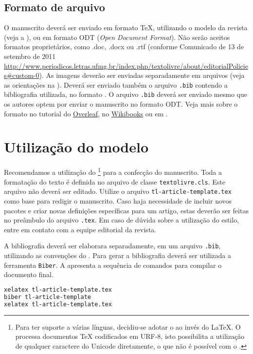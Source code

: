 \documentclass{textolivre}
\begin{document}
\subsection{Formato de arquivo}\label{sec-formato}
O manuscrito deverá ser enviado em formato \TeX{}, utilizando o modelo da revista (veja a ),
ou em formato ODT (\emph{Open Document Format}). Não serão aceitos formatos proprietários, como .doc, .docx ou .rtf
(conforme Comunicado de 13 de setembro de 2011 \url{http://www.periodicos.letras.ufmg.br/index.php/textolivre/about/editorialPolicies#custom-0}). 
As imagens deverão ser enviadas separadamente em arquivos (veja as orientações na ).
Deverá ser enviado também o arquivo \texttt{.bib} contendo a bibliografia utilizada, no formato .
O arquivo \texttt{.bib} deverá ser enviado mesmo que os autores optem por enviar o manuscrito no formato ODT.
Veja mais sobre o formato  no tutorial do \href{https://www.overleaf.com/learn/latex/Bibliography_management_in_LaTeX#The_bibliography_file}{Overleaf},
no \href{https://en.wikibooks.org/wiki/LaTeX/Bibliography_Management}{Wikibooks} ou em \textcite{araujo2020}.



\section{Utilização do modelo}\label{sec-modelo}
Recomendamos a utilização do \footnote{
Para ter suporte a várias línguas, decidiu-se adotar o  ao invés do \LaTeX{}.
O  processa documentos \TeX{} codificados em URF-8, isto possibilita 
a utilização de qualquer caractere do Unicode diretamente, o que não é possível com o .  
} para a confecção do manuscrito.
Toda a formatação do texto é definida no arquivo de classe \texttt{textolivre.cls}. 
Este arquivo não deverá ser editado. 
Utilize o arquivo \texttt{tl-article-template.tex} como base para redigir o manuscrito.
Caso haja necessidade de incluir novos pacotes e criar novas definições específicas para um artigo, 
estas deverão ser feitas no preâmbulo do arquivo \texttt{.tex}. 
Em caso de dúvida sobre a utilização do estilo, entre em contato com a equipe editorial da revista.

A bibliografia deverá ser elaborara separadamente, em um arquivo \texttt{.bib}, utilizando as 
convenções do . Para gerar a bibliografia deverá ser utilizada a ferramenta \texttt{Biber}.
A  apresenta a sequência de comandos para compilar o documento final.
\begin{lstlisting}[language=bash, label=lst-compiledocument, caption={Sequência para gerar o documento final.}]
xelatex tl-article-template.tex 
biber tl-article-template 
xelatex tl-article-template.tex
\end{lstlisting} %
\end{document}
